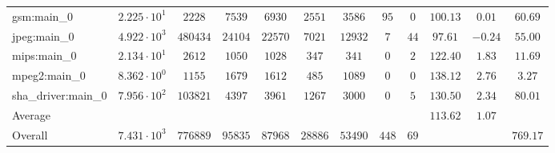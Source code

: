 \begin{tabular}{|l|c|c|c|c|c|c|c|c|c|c|c|}
gsm:main\_0             & $ 2.225 \cdot 10^{1}  $ & $ 2228   $ & $ 7539  $ & $ 6930  $ & $ 2551  $ & $ 3586  $ & $ 95  $ & $ 0  $ & $ 100.13      $ & $ 0.01    $ & $ 60.69   $ \\
jpeg:main\_0            & $ 4.922 \cdot 10^{3}  $ & $ 480434 $ & $ 24104 $ & $ 22570 $ & $ 7021  $ & $ 12932 $ & $ 7   $ & $ 44 $ & $ 97.61       $ & $ -0.24   $ & $ 55.00   $ \\
mips:main\_0            & $ 2.134 \cdot 10^{1}  $ & $ 2612   $ & $ 1050  $ & $ 1028  $ & $ 347   $ & $ 341   $ & $ 0   $ & $ 2  $ & $ 122.40      $ & $ 1.83    $ & $ 11.69   $ \\
mpeg2:main\_0           & $ 8.362 \cdot 10^{0}  $ & $ 1155   $ & $ 1679  $ & $ 1612  $ & $ 485   $ & $ 1089  $ & $ 0   $ & $ 0  $ & $ 138.12      $ & $ 2.76    $ & $ 3.27    $ \\
sha\_driver:main\_0     & $ 7.956 \cdot 10^{2}  $ & $ 103821 $ & $ 4397  $ & $ 3961  $ & $ 1267  $ & $ 3000  $ & $ 0   $ & $ 5  $ & $ 130.50      $ & $ 2.34    $ & $ 80.01   $ \\
\hline
Average                 & $                     $ & $        $ & $       $ & $       $ & $       $ & $       $ & $     $ & $    $ & $ 113.62      $ & $ 1.07    $ & $         $ \\
\hline
Overall                 & $ 7.431 \cdot 10^{3}  $ & $ 776889 $ & $ 95835 $ & $ 87968 $ & $ 28886 $ & $ 53490 $ & $ 448 $ & $ 69 $ & $             $ & $         $ & $ 769.17  $ \\
\hline
\end{tabular}
